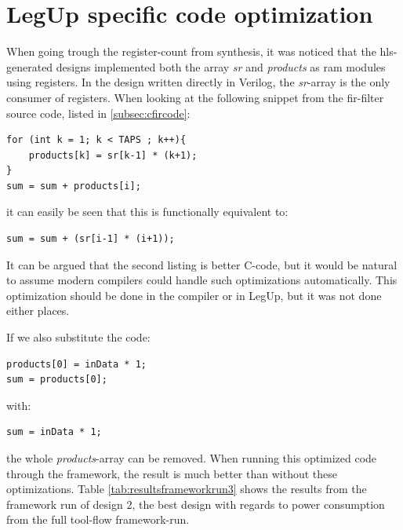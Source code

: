 \section{\label{sec:codeoptimization}LegUp specific code optimization}

When going trough the register-count from synthesis, it was noticed that the \gls{hls}-generated designs implemented both the array \textit{sr} and \textit{products} as \gls{ram} modules using registers. In the design written directly in Verilog, the \textit{sr}-array is the only consumer of registers. When looking at the following snippet from the \gls{fir}-filter source code, listed in \cref{subsec:cfircode}:
\lstset{language=C,style=CStyle}
\begin{lstlisting}
for (int k = 1; k < TAPS ; k++){
    products[k] = sr[k-1] * (k+1);
}
sum = sum + products[i];
\end{lstlisting}
it can easily be seen that this is functionally equivalent to:
\begin{lstlisting}
sum = sum + (sr[i-1] * (i+1));
\end{lstlisting}
It can be argued that the second listing is better C-code, but it would be natural to assume modern compilers could handle such optimizations automatically. This optimization should be done in the compiler or in LegUp, but it was not done either places.

If we also substitute the code:
\begin{lstlisting}
products[0] = inData * 1;
sum = products[0];
\end{lstlisting}
with:
\begin{lstlisting}
sum = inData * 1;
\end{lstlisting}
the whole \textit{products}-array can be removed. When running this optimized code through the framework, the result is much better than without these optimizations. Table \ref{tab:resultsframeworkrun3} shows the results from the framework run of design 2, the best design with regards to power consumption from the full tool-flow framework-run.

